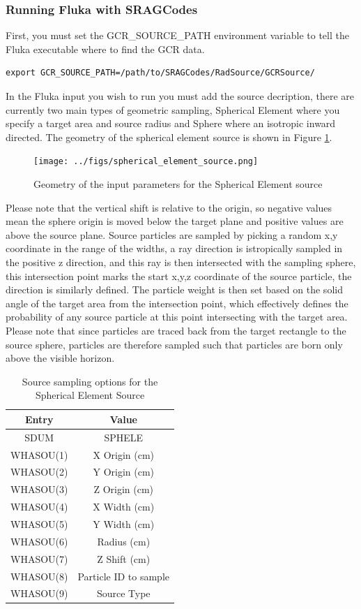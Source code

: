 \subsubsection*{Running Fluka with SRAGCodes}
First, you must set the GCR\_SOURCE\_PATH environment variable to tell the Fluka executable where to find the GCR data. 
\begin{lstlisting}
export GCR_SOURCE_PATH=/path/to/SRAGCodes/RadSource/GCRSource/
\end{lstlisting}
In the Fluka input you wish to run you must add the source decription, there are currently two main types of 
geometric sampling, Spherical Element where you specify a target area and source radius and Sphere where an isotropic
inward directed. The geometry of the spherical element source is shown in Figure \ref{fig:spherical_element}.

\begin{figure}[ht!]
 \begin{centering}
 \centering
 \texttt{[image: ../figs/spherical\_element\_source.png]}
 \caption{Geometry of the input parameters for the Spherical Element source}
 \label{fig:spherical_element}
 \end{centering}
\end{figure}
Please note that the vertical shift is relative to the origin, so negative values mean the sphere origin is moved below the target plane
and positive values are above the source plane. Source particles are sampled by picking a random x,y coordinate in the range of the 
widths, a ray direction is istropically sampled in the positive z direction, and this ray is then intersected with the sampling sphere, 
this intersection point marks the start x,y,z coordinate of the source particle, the direction is similarly defined. The particle weight
is then set based on the solid angle of the target area from the intersection point, which effectively defines the probability of 
any source particle at this point intersecting with the target area. Please note that since particles are traced back from the target 
rectangle to the source sphere, particles are therefore sampled such that particles are born only above the visible horizon.  

\begin{table}[ht!]
 \begin{tabular}{c|c}
 Entry & Value \\
 \hline
 SDUM & SPHELE \\
 WHASOU(1) & X Origin (cm) \\
 WHASOU(2) & Y Origin (cm) \\
 WHASOU(3) & Z Origin (cm) \\
 WHASOU(4) & X Width  (cm) \\
 WHASOU(5) & Y Width  (cm) \\
 WHASOU(6) & Radius   (cm) \\
 WHASOU(7) & Z Shift  (cm) \\
 WHASOU(8) & Particle ID to sample \\
 WHASOU(9) & Source Type 
 \end{tabular}
\label{tab:sphele_source}
\caption{Source sampling options for the Spherical Element Source}
\end{table}

